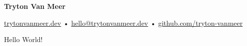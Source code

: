 \documentclass[11pt]{article}
\begin{document}
\begin{center}
    \textbf{Tryton Van Meer}

    \href{https://trytonvanmeer.dev}{trytonvanmeer.dev} •
    \href{mailto:hello@trytonvanmeer.dev}{hello@trytonvanmeer.dev} •
    \href{https://github.com/tryton-vanmeer}{github.com/tryton-vanmeer}
\end{center}

Hello World!
\end{document}
